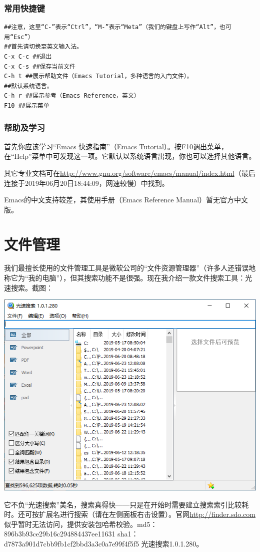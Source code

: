 \documentclass{book}
\begin{document}
\subsubsection{常用快捷键}
\begin{verbatim}
##注意，这里“C-”表示“Ctrl”，“M-”表示“Meta”（我们的键盘上写作“Alt”，也可用“Esc”）
##首先请切换至英文输入法。
C-x C-c ##退出
C-x C-s ##保存当前文件
C-h t ##展示帮助文件（Emacs Tutorial，多种语言的入门文件）。
##默认系统语言。
C-h r ##展示参考（Emacs Reference，英文）
F10 ##展示菜单
\end{verbatim}
\subsubsection{帮助及学习}
首先你应该学习“Emacs 快速指南”（Emacs Tutorial）。按F10调出菜单，在“Help”菜单中可发现这一项。它默认以系统语言出现，你也可以选择其他语言。\par
其它专业文档可在\url{http://www.gnu.org/software/emacs/manual/index.html}（最后连接于2019年06月20日18:44:09，网速较慢）中找到。\par
Emacs的中文支持较差，其使用手册（Emacs Reference Manual）暂无官方中文版。
\section{文件管理}
我们最擅长使用的文件管理工具是微软公司的“文件资源管理器”（许多人还错误地称它为“我的电脑”），但其搜索功能不是很强。现在我介绍一款文件搜索工具：光速搜索。截图：
\begin{center}
	\includegraphics[scale=0.5]{pic/finder}
\end{center}
它不负“光速搜索”美名，搜索真得快——只是在开始时需要建立搜索索引比较耗时。还可按扩展名进行搜索（请在左侧面板右击设置）。官网\url{http://finder.sdo.com}似乎暂时无法访问，提供安装包哈希校验。md5：896b3b93ce29b16c294884437ee11631 sha1：d7873a901d7cbb9fb1cf2bbd3a3c0a7e99f4f5f5 光速搜索1.0.1.280。
\end{document}
